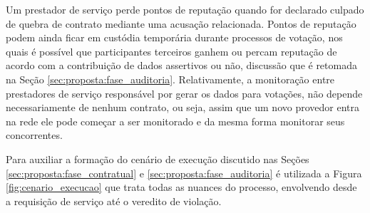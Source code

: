 %
Um prestador de serviço perde pontos de reputação quando for declarado culpado de quebra de contrato mediante uma acusação relacionada. Pontos de reputação podem ainda ficar em custódia temporária durante processos de votação, nos quais é possível que participantes terceiros ganhem ou percam reputação de acordo com a contribuição de dados assertivos ou não, discussão que é retomada na Seção \ref{sec:proposta:fase_auditoria}. 
%
Relativamente, a monitoração entre prestadores de serviço responsável por gerar os dados para votações, não depende necessariamente de nenhum contrato, ou seja, assim que um novo provedor entra na rede ele pode começar a ser monitorado e da mesma forma monitorar seus concorrentes.

%
Para auxiliar a formação do cenário de execução discutido nas Seções \ref{sec:proposta:fase_contratual} e \ref{sec:proposta:fase_auditoria} é utilizada a Figura \ref{fig:cenario_execucao} que trata todas as nuances do processo, envolvendo desde a requisição de serviço até o veredito de violação.

